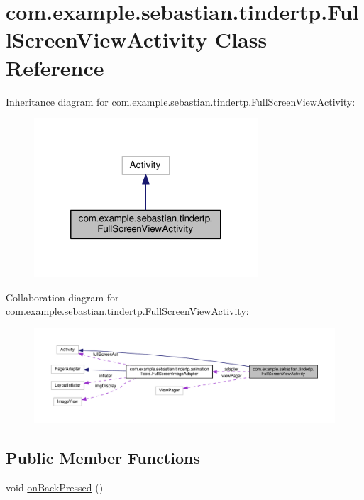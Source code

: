\hypertarget{classcom_1_1example_1_1sebastian_1_1tindertp_1_1FullScreenViewActivity}{}\section{com.\+example.\+sebastian.\+tindertp.\+Full\+Screen\+View\+Activity Class Reference}
\label{classcom_1_1example_1_1sebastian_1_1tindertp_1_1FullScreenViewActivity}


Inheritance diagram for com.\+example.\+sebastian.\+tindertp.\+Full\+Screen\+View\+Activity\+:\nopagebreak
\begin{figure}[H]
\begin{center}
\leavevmode
\includegraphics[width=236pt]{classcom_1_1example_1_1sebastian_1_1tindertp_1_1FullScreenViewActivity__inherit__graph}
\end{center}
\end{figure}


Collaboration diagram for com.\+example.\+sebastian.\+tindertp.\+Full\+Screen\+View\+Activity\+:\nopagebreak
\begin{figure}[H]
\begin{center}
\leavevmode
\includegraphics[width=350pt]{classcom_1_1example_1_1sebastian_1_1tindertp_1_1FullScreenViewActivity__coll__graph}
\end{center}
\end{figure}
\subsection*{Public Member Functions}
\begin{DoxyCompactItemize}
\item 
void \hyperlink{classcom_1_1example_1_1sebastian_1_1tindertp_1_1FullScreenViewActivity_ab3e5e99f9f3e016ac05a404a4d7bb1a8}{on\+Back\+Pressed} ()
\end{DoxyCompactItemize}
